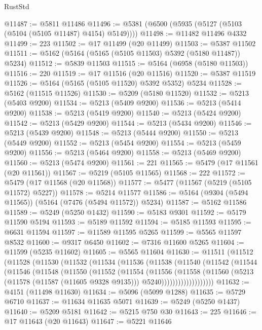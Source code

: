 \begin{lexlean}{RustStd}
\begin{coremodule}
@11487 := @5811 @11486
@11496 := @5381 (@6500 (@5935 (@5127 (@5103 (@5104 (@5105 @11487) @4154) @5149))))
@11498 := @11482 @11496 @4332
@11499 := 223
@11502 := @17 @11499 (@20 @11499)
@11503 := @5387 @11502
@11511 := @5162 (@5164 (@5165 (@5105 @11503) @5392 (@5180 @11487)) @5234)
@11512 := @5839 @11503
@11515 := @5164 (@6958 (@5180 @11503))
@11516 := 220
@11519 := @17 @11516 (@20 @11516)
@11520 := @5387 @11519
@11526 := @5164 (@5165 (@5105 @11520) @5392 @5352) @5234
@11528 := @5162 (@11515 @11526)
@11530 := @5209 (@5180 @11520)
@11532 := @5213 (@5403 @9200)
@11534 := @5213 (@5409 @9200)
@11536 := @5213 (@5414 @9200)
@11538 := @5213 (@5419 @9200)
@11540 := @5213 (@5424 @9200)
@11542 := @5213 (@5429 @9200)
@11544 := @5213 (@5434 @9200)
@11546 := @5213 (@5439 @9200)
@11548 := @5213 (@5444 @9200)
@11550 := @5213 (@5449 @9200)
@11552 := @5213 (@5454 @9200)
@11554 := @5213 (@5459 @9200)
@11556 := @5213 (@5464 @9200)
@11558 := @5213 (@5469 @9200)
@11560 := @5213 (@5474 @9200)
@11561 := 221
@11565 := @5479 (@17 @11561 (@20 @11561))
@11567 := @5219 (@5105 @11565)
@11568 := 222
@11572 := @5479 (@17 @11568 (@20 @11568))
@11577 := @5477 (@11567 (@5219 (@5105 @11572) @5227))
@11578 := @5214 @11577
@11586 := @5164 (@9304 (@5494 @11565)) (@5164 (@7476 (@5494 @11572)) @5234)
@11587 := @5162 @11586
@11589 := @5249 (@5250 @1432)
@11590 := @5183 @9301
@11592 := @5179 @11590 @5194
@11593 := @5189 @11592
@11594 := @5185 @11593
@11595 := @6631 @11594
@11597 := @11589 @11595 @5265
@11599 := @5565 @11597 @8532
@11600 := @9317 @6450
@11602 := @7316 @11600 @5265
@11604 := @11599 (@5235 @11602)
@11605 := @5565 @11604
@11630 := @11511
    (@11512
      (@11528
        (@11530
          (@11532
            (@11534
              (@11536
                (@11538
                  (@11540
                    (@11542
                      (@11544
                        (@11546
                          (@11548
                            (@11550
                              (@11552
                                (@11554
                                  (@11556
                                    (@11558
                                      (@11560
                                        (@5213
                                          (@11578 (@11587 (@11605 @9328 @9135)))
                                          @5240)))))))))))))))))))
@11632 := @4151 (@11498 @11630)
@11634 := @5096 (@5099 @1288)
@11635 := @5729 @6710
@11637 := @11634 @11635 @5071
@11639 := @5249 (@5250 @1437)
@11640 := @5209 @5181
@11642 := @5215 @750 @30
@11643 := 225
@11646 := @17 @11643 (@20 @11643)
@11647 := @5221 @11646

\end{coremodule}
\end{lexlean}
